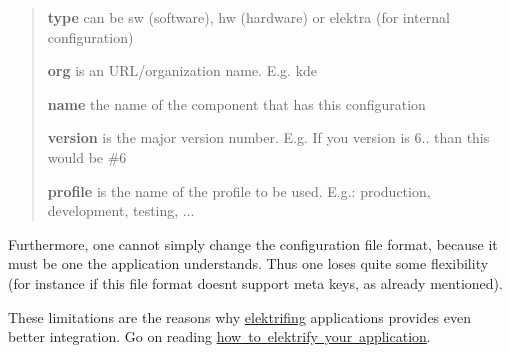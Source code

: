 \begin{quote}

\begin{DoxyItemize}
\item {\bfseries{type}} can be {\ttfamily sw} (software), {\ttfamily hw} (hardware) or {\ttfamily elektra} (for internal configuration)
\item {\bfseries{org}} is an U\+R\+L/organization name. E.\+g. {\ttfamily kde}
\item {\bfseries{name}} the name of the component that has this configuration
\item {\bfseries{version}} is the major version number. E.\+g. If you version is 6.. than this would be {\ttfamily \#6}
\item {\bfseries{profile}} is the name of the profile to be used. E.\+g.\+: {\ttfamily production}, {\ttfamily development}, {\ttfamily testing}, ... 
\end{DoxyItemize}\end{quote}


Furthermore, one cannot simply change the configuration file format, because it must be one the application understands. Thus one loses quite some flexibility (for instance if this file format doesn\textquotesingle{}t support meta keys, as already mentioned).

These limitations are the reasons why \mbox{\hyperlink{doc_help_elektra-glossary_md}{elektrifing}} applications provides even better integration. Go on reading \mbox{\hyperlink{doc_tutorials_application-integration_md}{how to elektrify your application}}. 